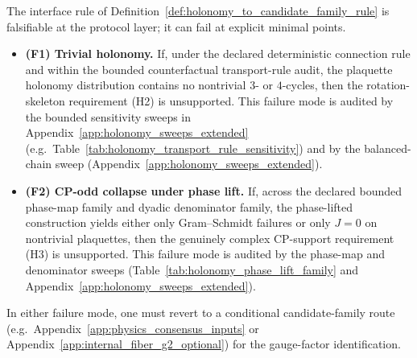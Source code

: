 \AuditTag The interface rule of Definition~\ref{def:holonomy_to_candidate_family_rule} is falsifiable at the protocol layer; it can fail at explicit minimal points.
\begin{itemize}
  \item \textbf{(F1) Trivial holonomy.} If, under the declared deterministic connection rule and within the bounded counterfactual transport-rule audit, the plaquette holonomy distribution contains no nontrivial $3$- or $4$-cycles, then the rotation-skeleton requirement (H2) is unsupported. This failure mode is audited by the bounded sensitivity sweeps in Appendix~\ref{app:holonomy_sweeps_extended} (e.g.\ Table~\ref{tab:holonomy_transport_rule_sensitivity}) and by the balanced-chain sweep (Appendix~\ref{app:holonomy_sweeps_extended}).
  \item \textbf{(F2) CP-odd collapse under phase lift.} If, across the declared bounded phase-map family and dyadic denominator family, the phase-lifted construction yields either only Gram--Schmidt failures or only $J=0$ on nontrivial plaquettes, then the genuinely complex CP-support requirement (H3) is unsupported. This failure mode is audited by the phase-map and denominator sweeps (Table~\ref{tab:holonomy_phase_lift_family} and Appendix~\ref{app:holonomy_sweeps_extended}).
\end{itemize}
In either failure mode, one must revert to a conditional candidate-family route (e.g.\ Appendix~\ref{app:physics_consensus_inputs} or Appendix~\ref{app:internal_fiber_g2_optional}) for the gauge-factor identification.

